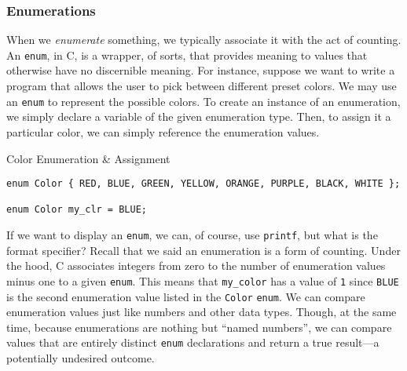 


\subsubsection*{Enumerations}
When we \textit{enumerate} something, we typically associate it with the act of counting. An \texttt{enum}, in C, is a wrapper, of sorts, that provides meaning to values that otherwise have no discernible meaning. For instance, suppose we want to write a program that allows the user to pick between different preset colors. We may use an \texttt{enum} to represent the possible colors. To create an instance of an enumeration, we simply declare a variable of the given enumeration type. Then, to assign it a particular color, we can simply reference the enumeration values.

\begin{cl}[main.c]{Color Enumeration \& Assignment}\begin{lstlisting}[language=MyC]
enum Color { RED, BLUE, GREEN, YELLOW, ORANGE, PURPLE, BLACK, WHITE };

enum Color my_clr = BLUE;
\end{lstlisting}\end{cl}

If we want to display an \texttt{enum}, we can, of course, use \texttt{printf}, but what is the format specifier? Recall that we said an enumeration is a form of counting. Under the hood, C associates integers from zero to the number of enumeration values minus one to a given \texttt{enum}. This means that \texttt{my\_color} has a value of \texttt{1} since \texttt{BLUE} is the second enumeration value listed in the \texttt{Color} \texttt{enum}. We can compare enumeration values just like numbers and other data types. Though, at the same time, because enumerations are nothing but ``named numbers'', we can compare values that are entirely distinct \texttt{enum} declarations and return a true result---a potentially undesired outcome.

